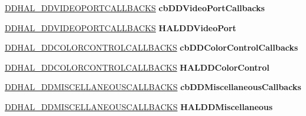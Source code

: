 \begin{DoxyCompactItemize}
\item 
\mbox{\label{struct___d_d_h_a_l___c_a_l_l_b_a_c_k_s_a7181f480243d68b9de63cc2c40b89dcd}} 
\hyperlink{struct___d_d_h_a_l___d_d_v_i_d_e_o_p_o_r_t_c_a_l_l_b_a_c_k_s}{D\+D\+H\+A\+L\+\_\+\+D\+D\+V\+I\+D\+E\+O\+P\+O\+R\+T\+C\+A\+L\+L\+B\+A\+C\+KS} {\bfseries cb\+D\+D\+Video\+Port\+Callbacks}
\item 
\mbox{\label{struct___d_d_h_a_l___c_a_l_l_b_a_c_k_s_a3035938f55ad80dda88b1b8643b5e4b5}} 
\hyperlink{struct___d_d_h_a_l___d_d_v_i_d_e_o_p_o_r_t_c_a_l_l_b_a_c_k_s}{D\+D\+H\+A\+L\+\_\+\+D\+D\+V\+I\+D\+E\+O\+P\+O\+R\+T\+C\+A\+L\+L\+B\+A\+C\+KS} {\bfseries H\+A\+L\+D\+D\+Video\+Port}
\item 
\mbox{\label{struct___d_d_h_a_l___c_a_l_l_b_a_c_k_s_a80e69b79c83ab3e38d10ffec99014633}} 
\hyperlink{struct___d_d_h_a_l___d_d_c_o_l_o_r_c_o_n_t_r_o_l_c_a_l_l_b_a_c_k_s}{D\+D\+H\+A\+L\+\_\+\+D\+D\+C\+O\+L\+O\+R\+C\+O\+N\+T\+R\+O\+L\+C\+A\+L\+L\+B\+A\+C\+KS} {\bfseries cb\+D\+D\+Color\+Control\+Callbacks}
\item 
\mbox{\label{struct___d_d_h_a_l___c_a_l_l_b_a_c_k_s_aa41e853718d1140ba5c027a7441c461b}} 
\hyperlink{struct___d_d_h_a_l___d_d_c_o_l_o_r_c_o_n_t_r_o_l_c_a_l_l_b_a_c_k_s}{D\+D\+H\+A\+L\+\_\+\+D\+D\+C\+O\+L\+O\+R\+C\+O\+N\+T\+R\+O\+L\+C\+A\+L\+L\+B\+A\+C\+KS} {\bfseries H\+A\+L\+D\+D\+Color\+Control}
\item 
\mbox{\label{struct___d_d_h_a_l___c_a_l_l_b_a_c_k_s_a613dfd9fed42a5c31062630144aa0605}} 
\hyperlink{struct___d_d_h_a_l___d_d_m_i_s_c_e_l_l_a_n_e_o_u_s_c_a_l_l_b_a_c_k_s}{D\+D\+H\+A\+L\+\_\+\+D\+D\+M\+I\+S\+C\+E\+L\+L\+A\+N\+E\+O\+U\+S\+C\+A\+L\+L\+B\+A\+C\+KS} {\bfseries cb\+D\+D\+Miscellaneous\+Callbacks}
\item 
\mbox{\label{struct___d_d_h_a_l___c_a_l_l_b_a_c_k_s_ab735f4cc3b8cf620607ffd5219196f32}} 
\hyperlink{struct___d_d_h_a_l___d_d_m_i_s_c_e_l_l_a_n_e_o_u_s_c_a_l_l_b_a_c_k_s}{D\+D\+H\+A\+L\+\_\+\+D\+D\+M\+I\+S\+C\+E\+L\+L\+A\+N\+E\+O\+U\+S\+C\+A\+L\+L\+B\+A\+C\+KS} {\bfseries H\+A\+L\+D\+D\+Miscellaneous}
\item 

\end{DoxyCompactItemize}
